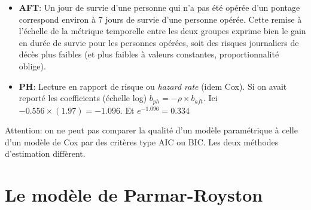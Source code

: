 \documentclass[
  12pt,
  letterpaper,
  DIV=11,
  numbers=noendperiod,
  onepage,
  openany]{scrreprt}
\begin{document}
\begin{itemize}
\item
  \textbf{AFT}: Un jour de survie d'une personne qui n'a pas été opérée
  d'un pontage correspond environ à 7 jours de survie d'une personne
  opérée. Cette remise à l'échelle de la métrique temporelle entre les
  deux groupes exprime bien le gain en durée de survie pour les
  personnes opérées, soit des risques journaliers de décès plus faibles
  (et plus faibles à valeurs constantes, proportionnalité oblige).
\item
  \textbf{PH}: Lecture en rapport de risque ou \emph{hazard rate} (idem
  Cox). Si on avait reporté les coefficients (échelle log)
  \(b_{ph} = -\rho \times b_{aft}\). Ici
  \(-0.556 \times (1.97) = -1.096\). Et \(e^{-1.096}=0.334\)
\end{itemize}

Attention: on ne peut pas comparer la qualité d'un modèle paramétrique à
celle d'un modèle de Cox par des critères type AIC ou BIC. Les deux
méthodes d'estimation diffèrent.

\hypertarget{le-moduxe8le-de-parmar-royston}{%
\section{Le modèle de
Parmar-Royston}\label{le-moduxe8le-de-parmar-royston}}
\end{document}
